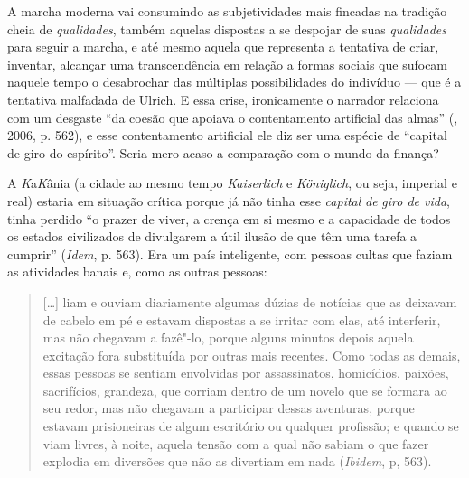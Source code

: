 A marcha moderna vai consumindo as subjetividades mais fincadas na
tradição cheia de \emph{qualidades}, também aquelas dispostas a se
despojar de suas \emph{qualidades} para seguir a marcha, e até mesmo
aquela que representa a tentativa de criar, inventar, alcançar uma
transcendência em relação a formas sociais que sufocam naquele tempo o
desabrochar das múltiplas possibilidades do indivíduo --- que é a
tentativa malfadada de Ulrich. E essa crise, ironicamente o narrador
relaciona com um desgaste ``da coesão que apoiava o contentamento
artificial das almas'' (, 2006, p. 562), e esse contentamento
artificial ele diz ser uma espécie de ``capital de giro do espírito''.
Seria mero acaso a comparação com o mundo da finança?

A \emph{K}a\emph{K}ânia (a cidade ao mesmo tempo \emph{Kaiserlich} e
\emph{Königlich}, ou seja, imperial e real) estaria em situação crítica
porque já não tinha esse \emph{capital} \emph{de} \emph{giro de vida},
tinha perdido ``o prazer de viver, a crença em si mesmo e a capacidade
de todos os estados civilizados de divulgarem a útil ilusão de que têm
uma tarefa a cumprir'' (\emph{Idem}, p. 563). Era um país
inteligente, com pessoas cultas que faziam as atividades banais e, como
as outras pessoas:

\begin{quote}
[\ldots{}] liam e ouviam diariamente algumas dúzias de notícias que as
deixavam de cabelo em pé e estavam dispostas a se irritar com elas, até
interferir, mas não chegavam a fazê"-lo, porque alguns minutos depois
aquela excitação fora substituída por outras mais recentes. Como todas
as demais, essas pessoas se sentiam envolvidas por assassinatos,
homicídios, paixões, sacrifícios, grandeza, que corriam dentro de um
novelo que se formara ao seu redor, mas não chegavam a participar dessas
aventuras, porque estavam prisioneiras de algum escritório ou qualquer
profissão; e quando se viam livres, à noite, aquela tensão com a qual
não sabiam o que fazer explodia em diversões que não as divertiam em
nada (\emph{Ibidem}, p, 563).
\end{quote}

